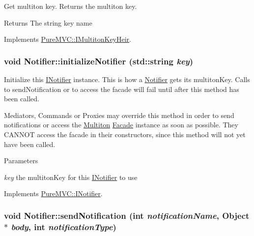 Get multiton key. Returns the multiton key. \begin{DoxyReturn}{Returns}
The string key name 
\end{DoxyReturn}


Implements \hyperlink{class_pure_m_v_c_1_1_i_multiton_key_heir_aecccfb9898368c6377550ceae5730934}{PureMVC::IMultitonKeyHeir}.\hypertarget{class_pure_m_v_c_1_1_notifier_a6910365c70415ba7973401215f57e4af}{
\subsubsection[{initializeNotifier}]{\setlength{\rightskip}{0pt plus 5cm}void Notifier::initializeNotifier (std::string {\em key})}}
\label{class_pure_m_v_c_1_1_notifier_a6910365c70415ba7973401215f57e4af}


Initialize this \hyperlink{class_pure_m_v_c_1_1_i_notifier}{INotifier} instance. This is how a \hyperlink{class_pure_m_v_c_1_1_notifier}{Notifier} gets its multitonKey. Calls to sendNotification or to access the facade will fail until after this method has been called.

Mediators, Commands or Proxies may override this method in order to send notifications or access the \hyperlink{class_pure_m_v_c_1_1_multiton}{Multiton} \hyperlink{class_pure_m_v_c_1_1_facade}{Facade} instance as soon as possible. They CANNOT access the facade in their constructors, since this method will not yet have been called.


\begin{DoxyParams}{Parameters}
\item[{\em key}]the multitonKey for this \hyperlink{class_pure_m_v_c_1_1_i_notifier}{INotifier} to use \end{DoxyParams}


Implements \hyperlink{class_pure_m_v_c_1_1_i_notifier_a28d7dbbe0726d4d52080546c5d79b232}{PureMVC::INotifier}.\hypertarget{class_pure_m_v_c_1_1_notifier_a55a358ee2661ecc08400653016fdb497}{
\subsubsection[{sendNotification}]{\setlength{\rightskip}{0pt plus 5cm}void Notifier::sendNotification (int {\em notificationName}, \/  {\bf Object} $\ast$ {\em body}, \/  int {\em notificationType})}}
\label{class_pure_m_v_c_1_1_notifier_a55a358ee2661ecc08400653016fdb497}



